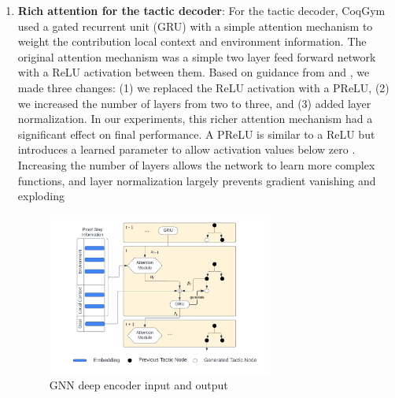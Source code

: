 \documentclass{article}
\begin{document}
\begin{enumerate}

    \item \textbf{Rich attention for the tactic decoder}: For the tactic decoder, CoqGym used a gated recurrent unit (GRU) with a simple attention mechanism to weight the contribution local context and environment information. The original attention mechanism was a simple two layer feed forward network with a ReLU activation between them. Based on guidance from \cite{prelu} and \cite{layernorm}, we made three changes: (1) we replaced the ReLU activation with a PReLU, (2) we increased the number of layers from two to three, and (3) added layer normalization. In our experiments, this richer attention mechanism had a significant effect on final performance. A PReLU is similar to a ReLU but introduces a learned parameter to allow activation values below zero \cite{prelu}. Increasing the number of layers allows the network to learn more complex functions, and layer normalization largely prevents gradient vanishing and exploding \cite{layernorm}
   
    \begin{figure}[H]
        \centering
        \includegraphics[width=0.7\textwidth]{images/Decoder.png}
        \caption{GNN deep encoder input and output}
        \label{fig:encoder}
    \end{figure}
    

\end{enumerate}
\end{document}
